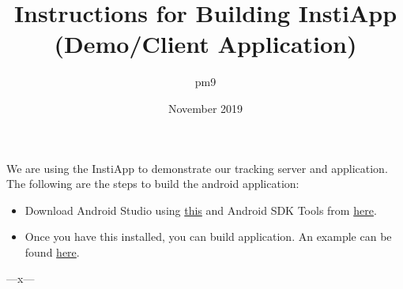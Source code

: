 \documentclass{article}
\title{Instructions for Building InstiApp (Demo/Client Application)}
\author{pm9}
\date{November 2019}
\begin{document}
\maketitle

We are using the InstiApp to demonstrate our tracking server and application. The following are the steps to build the android application:
\begin{itemize}
    \item 
    Download Android Studio using \href{https://developer.android.com/studio/install}{this} and Android SDK Tools from \href{http://www.androiddocs.com/sdk/installing/index.html}{here}.
    \item
    Once you have this installed, you can build application. An example can be found \href{https://developer.android.com/studio/run}{here}.
\end{itemize}
\begin{center}
---x---
\end{center}
\end{document}
